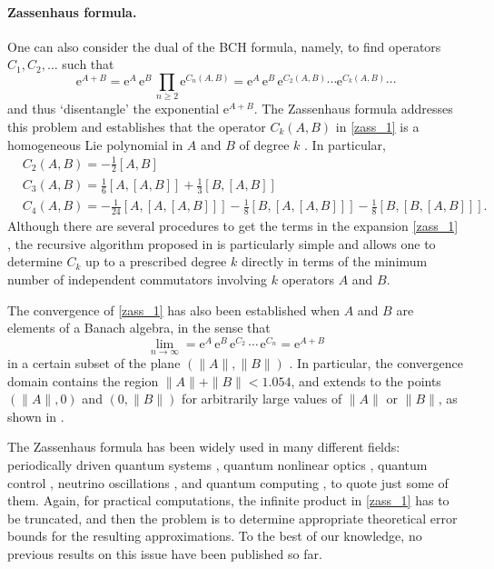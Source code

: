 \documentclass[11pt]{article}
\newcommand{\e}{\ensuremath{\mathrm{e}}}
\begin{document}
\paragraph{Zassenhaus formula.} One can also consider the dual of the BCH formula, namely, to find operators $C_1, C_2, \ldots$ such that
\begin{equation} \label{zass_1}
  \e^{A + B} = \e^{A} \, \e^{B} \, \prod_{n \ge 2} \e^{ C_n(A,B)} = \e^{A} \, \e^{B} \, \e^{C_2(A,B)} \cdots \e^{ C_k(A,B)} \cdots
\end{equation}
and thus `disentangle' the exponential $\e^{A + B}$. The Zassenhaus formula addresses this problem and establishes that the operator
$C_k(A,B)$ in \eqref{zass_1} is a homogeneous Lie polynomial
in $A$ and $B$ of degree $k$ \cite{magnus54ote}. In particular,
\begin{equation} \label{first_terms_z}
\begin{aligned}
 & C_2(A,B) = -\frac{1}{2} [A, B] \\
 & C_3(A,B) = \frac{1}{6} [A,[A,B]]  + \frac{1}{3} [B,[A,B]]  \\
 & C_4(A,B) = -\frac{1}{24} [A,[A,[A,B]]] - \frac{1}{8} [B,[A,[A,B]]] - \frac{1}{8} [B,[B,[A,B]]].
\end{aligned}
\end{equation}
Although there are several procedures to get the terms in the expansion \eqref{zass_1} \cite{baues81cca,suzuki77otc,weyrauch09ctb}, 
the recursive algorithm proposed in \cite{casas12eco} 
is particularly simple and allows
one to determine $C_k$ up to a prescribed degree $k$ directly in terms of the minimum number of independent commutators involving $k$ operators $A$ and $B$. 

The convergence of \eqref{zass_1} has also been established when $A$ and $B$ are elements of a Banach algebra, in the sense that
\[
 \lim_{n \rightarrow \infty} = \e^A \, \e^B \, \e^{C_2} \, \cdots \, \e^{C_n} = \e^{A+B}
\]
in a certain subset of the plane $(\|A\|, \|B\|)$ \cite{suzuki77otc,bayen79otc}. 
In particular, the convergence domain contains the region $\|A\| + \|B\| < 1.054$, and extends to the points
$(\|A\|,0)$ and $(0, \|B\|)$ for arbitrarily large values of $\|A\|$ or $\|B\|$, as shown in \cite{casas12eco}. 

The Zassenhaus formula has been widely used in many different fields: periodically driven quantum systems \cite{goldman14pdq}, 
quantum nonlinear optics \cite{quesada14eot}, quantum control \cite{weidner25rqc}, neutrino oscillations \cite{chattopadhyay22npw}, 
and quantum computing \cite{zuk24rgw}, to quote just some of them. Again, for practical computations, the infinite product in \eqref{zass_1} has to be
truncated, and then the problem is to determine appropriate theoretical error bounds for the resulting approximations. To the best of our knowledge, no previous results on this issue have been published so far.
\end{document}
